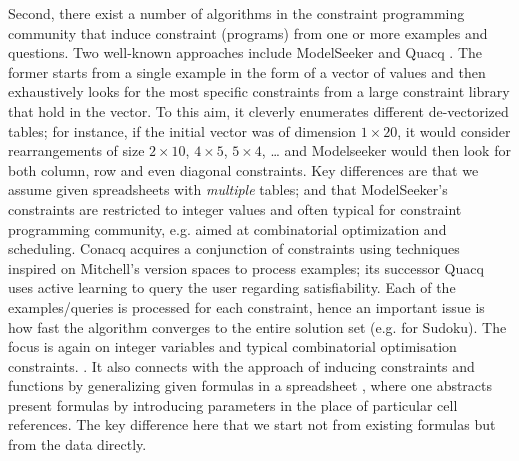 Second, there exist a number of algorithms in the constraint programming community that induce constraint (programs)
from one or more examples and questions. Two well-known approaches include ModelSeeker \cite{modelseeker} and Quacq \cite{Quacq}.
The former starts from a single example in the form of a vector of values and then exhaustively looks for the most specific constraints from a large constraint library that hold in the vector. To this aim, it cleverly enumerates different de-vectorized tables; for instance, if the initial vector was of dimension $1 \times 20$, it would consider rearrangements of size $2 \times 10$, $4 \times 5$, $5 \times 4$, … and Modelseeker would then look for both column, row  and even diagonal constraints. Key differences are that we assume given spreadsheets with \textit{multiple} tables; and that ModelSeeker's constraints are restricted to integer values and often typical for constraint programming community, e.g. aimed at combinatorial optimization and scheduling. Conacq \cite{Conacq} acquires a conjunction of constraints using techniques inspired on Mitchell's version spaces to process examples; its successor Quacq uses active learning to query the user regarding satisfiability. Each of the examples/queries is processed for each constraint, hence an important issue is how fast the algorithm converges to the entire solution set (e.g. for Sudoku).
The focus is again on integer variables and typical combinatorial optimisation constraints.  . It also connects with the approach of inducing constraints and functions by generalizing given formulas in a spreadsheet \cite{Isakowitz}, where one abstracts present formulas by introducing parameters in the place of particular cell references. The key difference here that we start not from existing formulas but from the data directly.


